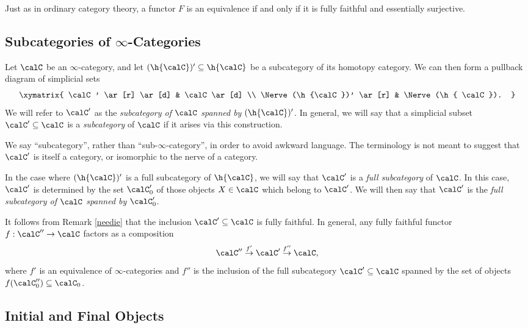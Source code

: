 Just as in ordinary category theory, a functor $F$ is an equivalence if and only if it is fully faithful and essentially surjective.

\subsection{Subcategories of $\infty$-Categories}

Let $\calC$ be an $\infty$-category, and let $(\h{\calC})' \subseteq \h{\calC}$ be a subcategory of its homotopy category. We can then form a pullback diagram of simplicial sets
$$ \xymatrix{ \calC' \ar[r] \ar[d] & \calC \ar[d] \\
\Nerve (\h{\calC})' \ar[r] & \Nerve (\h{ \calC}). }$$
We will refer to $\calC'$ as the {\it subcategory of $\calC$ spanned by $(\h{\calC})'$}. In general, we will say that a simplicial subset $\calC' \subseteq \calC$ is a {\it subcategory} of $\calC$ if it arises via this construction.

\begin{remark}
We say ``subcategory'', rather than ``sub-$\infty$-category'', in
order to avoid awkward language. The terminology is not meant to
suggest that $\calC'$ is itself a category, or isomorphic to the nerve
of a category.
\end{remark}

In the case where $(\h{\calC})'$ is a full subcategory of $\h{\calC}$, we will say that
$\calC'$ is a {\it full subcategory} of $\calC$. In this case, $\calC'$ is determined by the set
$\calC'_0$ of those objects $X \in \calC$ which belong to $\calC'$. We will then say that
$\calC'$ is the {\it full subcategory of $\calC$ spanned by $\calC'_0$}.

It follows from Remark \ref{needie} that
the inclusion $\calC' \subseteq \calC$ is fully faithful. In general, any fully faithful functor $f: \calC'' \rightarrow \calC$ factors as a composition
$$ \calC'' \stackrel{f'}{\rightarrow} \calC' \stackrel{f''}{\rightarrow} \calC,$$
where $f'$ is an equivalence of $\infty$-categories and $f''$ is the inclusion of the full subcategory
$\calC' \subseteq \calC$ spanned by the set of objects $f( \calC''_0 ) \subseteq \calC_0$.

\subsection{Initial and Final Objects}

